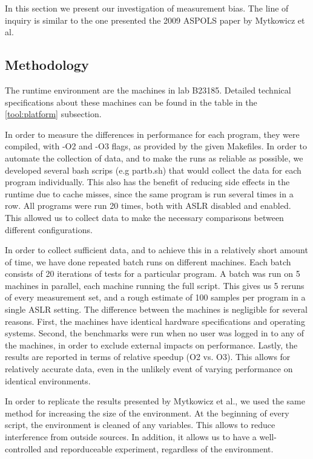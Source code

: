 \documentclass{article}
\begin{document}
In this section we present our investigation of measurement bias. The line of inquiry is similar to the one presented the 2009 ASPOLS paper by Mytkowicz et al.

\subsection{Methodology}
The runtime environment are the machines in lab B23185. Detailed technical specifications about these machines can be found in the table in the \ref{tool:platform} subsection.

In order to measure the differences in performance for each program, they were compiled, with -O2 and -O3 flags, as provided by the given Makefiles. In order to automate the collection of data, and to make the runs as reliable as possible, we developed several bash scrips (e.g partb.sh) that would collect the data for each program individually. This also has the benefit of reducing side effects in the runtime due to cache misses, since the same program is run several times in a row. All programs were run 20 times, both with ASLR disabled and enabled. This allowed us to collect data to make the necessary comparisons between different configurations.

In order to collect sufficient data, and to achieve this in a relatively short amount of time, we have done repeated batch runs on different machines. Each batch consists of 20 iterations of tests for a particular program. A batch was run on 5 machines in parallel, each machine running the full script. This gives us 5 reruns of every measurement set, and a rough estimate of 100 samples per program in a single ASLR setting. The difference between the machines is negligible for several reasons. First, the machines have identical hardware specifications and operating systems. Second, the benchmarks were run when no user was logged in to any of the machines, in order to exclude external impacts on performance. Lastly, the results are reported in terms of relative speedup (O2 vs. O3). This allows for relatively accurate data, even in the unlikely event of varying performance on identical environments.

In order to replicate the results presented by Mytkowicz et al., we used the same method for increasing the size of the environment. At the beginning of every script, the environment is cleaned of any variables. This allows to reduce interference from outside sources. In addition, it allows us to have a well-controlled and reporduceable experiment, regardless of the environment.
\end{document}

